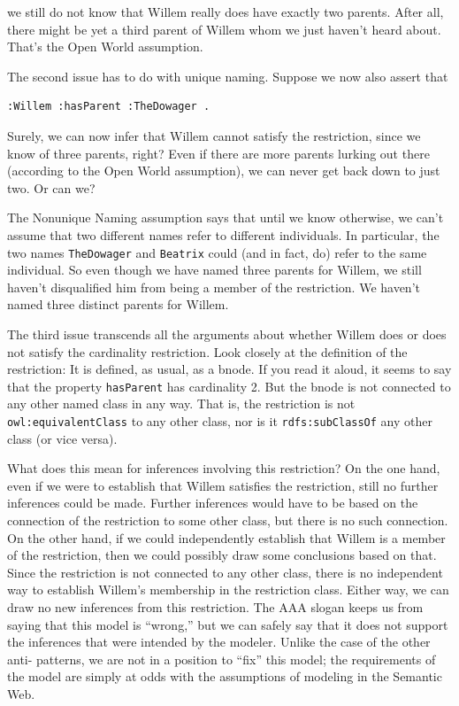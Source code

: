 we still do not know that Willem really does have exactly two parents.
After all, there might be yet a third parent of Willem whom we just
haven't heard about. That's the Open World assumption.

The second issue has to do with unique naming. Suppose we now also
assert that

\begin{lstlisting}
:Willem :hasParent :TheDowager .
\end{lstlisting}

Surely, we can now infer that Willem cannot satisfy the restriction,
since we know of three parents, right? Even if there are more parents
lurking out there (according to the Open World assumption), we can never
get back down to just two. Or can we?

The Nonunique Naming assumption says that until we know otherwise, we
can't assume that two different names refer to different individuals. In
particular, the two names \texttt{TheDowager} and \texttt{Beatrix} could (and in fact, do)
refer to the same individual. So even though we have named three parents
for Willem, we still haven't disqualified him from being a member of the
restriction. We haven't named three distinct parents for Willem.

The third issue transcends all the arguments about whether Willem does
or does not satisfy the
cardinality restriction. Look closely at the definition of the
restriction: It is defined, as usual, as a bnode. If you read it aloud, it seems to say that the property \texttt{hasParent} has cardinality 2. But the bnode is not
connected to any other named class in any way. That is, the restriction
is not \texttt{owl:equivalentClass} to any other class, nor is it \texttt{rdfs:subClassOf}
any other class (or vice versa).

What does this mean for inferences involving this restriction? On the
one hand, even if we were to establish that Willem satisfies the
restriction, still no further inferences could be made. Further
inferences would have to be based on the connection of the restriction
to some other class, but there is no such connection. On the other hand,
if we could independently establish that Willem is a member of the
restriction, then we could possibly draw some conclusions based on that.
Since the restriction is not connected to any other class, there is no
independent way to establish Willem's membership in the restriction
class. Either way, we can draw no new inferences from this restriction.
The AAA slogan keeps us from saying that this model is ``wrong,'' but we
can safely say that it does not support the inferences that were
intended by the modeler. Unlike the case of the other anti- patterns, we
are not in a position to ``fix'' this model; the requirements of the
model are simply at odds with the assumptions of modeling in the
Semantic Web.

